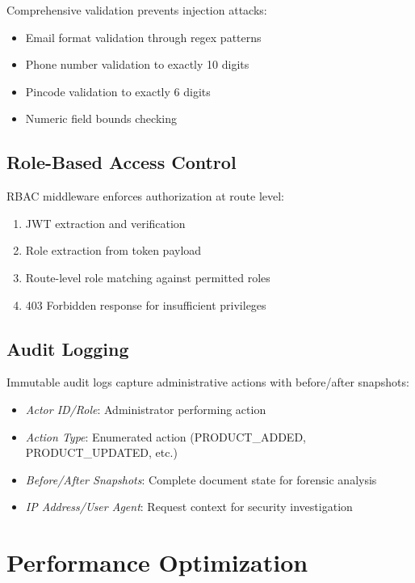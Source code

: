 \documentclass[conference]{IEEEtran}
\begin{document}
Comprehensive validation prevents injection attacks:
\begin{itemize}
\item Email format validation through regex patterns
\item Phone number validation to exactly 10 digits
\item Pincode validation to exactly 6 digits
\item Numeric field bounds checking
\end{itemize}

\subsection{Role-Based Access Control}

RBAC middleware enforces authorization at route level:

\begin{enumerate}
\item JWT extraction and verification
\item Role extraction from token payload
\item Route-level role matching against permitted roles
\item 403 Forbidden response for insufficient privileges
\end{enumerate}

\subsection{Audit Logging}

Immutable audit logs capture administrative actions with before/after snapshots:

\begin{itemize}
\item \textit{Actor ID/Role}: Administrator performing action
\item \textit{Action Type}: Enumerated action (PRODUCT\_ADDED, PRODUCT\_UPDATED, etc.)
\item \textit{Before/After Snapshots}: Complete document state for forensic analysis
\item \textit{IP Address/User Agent}: Request context for security investigation
\end{itemize}

\section{Performance Optimization}
\end{document}
